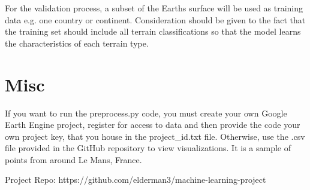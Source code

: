 \documentclass{article}
\begin{document}
For the validation process, a subset of the Earths surface will be used as training data e.g. one country or continent. Consideration should be given to the fact that the training set should include all terrain classifications so that the model learns the characteristics of each terrain type. 


\section{Misc}
If you  want to run the preprocess.py code, you must create your own Google Earth Engine project, register for access to data and then provide the code your own project key, that you house in the project\_id.txt file. Otherwise, use the .csv file provided in the GitHub repository to view visualizations. It is a sample of points from around Le Mans, France. 

Project Repo:
https://github.com/elderman3/machine-learning-project 
\end{document}
